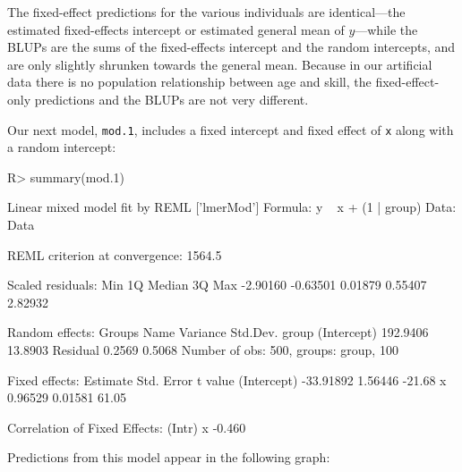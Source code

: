 \documentclass[
]{jss}
\begin{document}
The fixed-effect predictions for the various individuals are
identical---the estimated fixed-effects intercept or estimated general
mean of \(y\)---while the BLUPs are the sums of the fixed-effects
intercept and the random intercepts, and are only slightly shrunken
towards the general mean. Because in our artificial data there is no
population relationship between age and skill, the fixed-effect-only
predictions and the BLUPs are not very different.

Our next model, \texttt{mod.1}, includes a fixed intercept and fixed
effect of \texttt{x} along with a random intercept:

\begin{CodeChunk}
\begin{CodeInput}
R> summary(mod.1)
\end{CodeInput}
\begin{CodeOutput}
Linear mixed model fit by REML ['lmerMod']
Formula: y ~ x + (1 | group)
   Data: Data

REML criterion at convergence: 1564.5

Scaled residuals: 
     Min       1Q   Median       3Q      Max 
-2.90160 -0.63501  0.01879  0.55407  2.82932 

Random effects:
 Groups   Name        Variance Std.Dev.
 group    (Intercept) 192.9406 13.8903 
 Residual               0.2569  0.5068 
Number of obs: 500, groups:  group, 100

Fixed effects:
             Estimate Std. Error t value
(Intercept) -33.91892    1.56446  -21.68
x             0.96529    0.01581   61.05

Correlation of Fixed Effects:
  (Intr)
x -0.460
\end{CodeOutput}
\end{CodeChunk}

Predictions from this model appear in the following graph:
\end{document}
